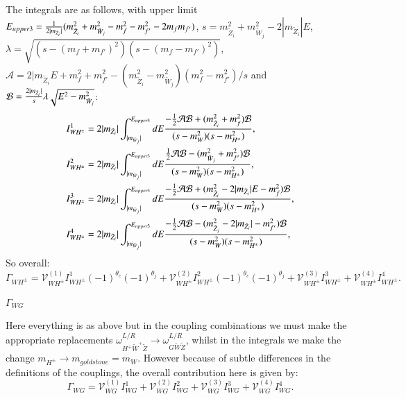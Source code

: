 \documentclass[final,3p,times,pdflatex]{elsarticle}
\begin{document}
The integrals are as follows, with upper limit $E_{upper3} = {1 \over 2 |m_{\tilde{Z}_i}|} (m_{\tilde{Z}_i}^2 + m_{\tilde{W}_j}^2 - m_{f}^2 - m_{f'}^2 - 2m_{f}m_{f'})$, $s = m_{\tilde{Z}_i}^2 + m_{\tilde{W}_j}^2 - 2|m_{\tilde{Z}_i}|E$, $\lambda = \sqrt{(s-(m_{f} + m_{f'})^2)(s-(m_{f}-m_{f'})^2)}$, $\mathcal{A} = 2|m_{\tilde{Z}_i}E + m_{f}^2 + m_{f'}^2 - (m_{\tilde{Z}_i}^2 - m_{\tilde{W}_j}^2)(m_{f}^2-m_{f'}^2)/s$ and $\mathcal{B} = {2|m_{\tilde{Z}_i}| \over s} \lambda \sqrt{E^2 - m_{\tilde{W}_j}^2} $:
\begin{align}
I_{W H^{\pm}}^{1} &= 2|m_{\tilde{Z}_i}| \int_{|m_{\tilde{W}_j}|}^{E_{upper3}} dE {-\frac{1}{2}\mathcal{A}\mathcal{B} + (m_{\tilde{Z}_i}^2 + m_{f}^2)\mathcal{B} \over (s-m_{W}^2)(s-m_{H^{\pm}}^2)}, \\
I_{W H^{\pm}}^{2} &= 2|m_{\tilde{Z}_i}| \int_{|m_{\tilde{W}_j}|}^{E_{upper3}} dE {\frac{1}{2}\mathcal{A}\mathcal{B} - (m_{\tilde{W}_j}^2 + m_{f'}^2)\mathcal{B} \over (s-m_{W}^2)(s-m_{H^{\pm}}^2)}, \\
I_{W H^{\pm}}^{3} &= 2|m_{\tilde{Z}_i}| \int_{|m_{\tilde{W}_j}|}^{E_{upper3}} dE {-\frac{1}{2}\mathcal{A}\mathcal{B} + (m_{\tilde{Z}_i}^2 -2|m_{\tilde{Z}_i}|E	 - m_{f}^2)\mathcal{B} \over (s-m_{W}^2)(s-m_{H^{\pm}}^2)}, \\
I_{W H^{\pm}}^{4} &= 2|m_{\tilde{Z}_i}| \int_{|m_{\tilde{W}_j}|}^{E_{upper3}} dE {-\frac{1}{2}\mathcal{A}\mathcal{B} - (m_{\tilde{Z}_j}^2 -2|m_{\tilde{Z}_i}| - m_{f'}^2)\mathcal{B} \over (s-m_{W}^2)(s-m_{H^{\pm}}^2)},
\end{align}
So overall:
\begin{equation}
\Gamma_{W H^{\pm}} = \mathcal{V}_{W H^{\pm}}^{(1)} I_{W H^{\pm}}^{1}(-1)^{\theta_c}(-1)^{\theta_j} + \mathcal{V}_{W H^{\pm}}^{(2)} I_{W H^{\pm}}^{2}(-1)^{\theta_c}(-1)^{\theta_j} + \mathcal{V}_{W H^{\pm}}^{(3)} I_{W H^{\pm}}^{3} + \mathcal{V}_{W H^{\pm}}^{(4)} I_{W H^{\pm}}^{4}.
\end{equation}

\textbf{\underline{$\Gamma_{W G}$}}

Here everything is as above but in the coupling combinations we must make the appropriate replacements $\omega_{H^+ \tilde{W}^+ \tilde{Z}}^{L/R} \rightarrow \omega_{G \tilde{W} \tilde{Z}}^{L/R}$, whilst in the integrals we make the change $m_{H^{\pm}} \rightarrow m_{goldstone} = m_{W}$. However because of subtle differences in the definitions of the couplings, the overall contribution here is given by:
\begin{equation}
\Gamma_{W G} = \mathcal{V}_{W G}^{(1)} I_{W G}^{1} + \mathcal{V}_{W G}^{(2)} I_{W G}^{2} + \mathcal{V}_{W G}^{(3)} I_{W G}^{3} + \mathcal{V}_{W G}^{(4)} I_{W G}^{4}.
\end{equation}
\end{document}
